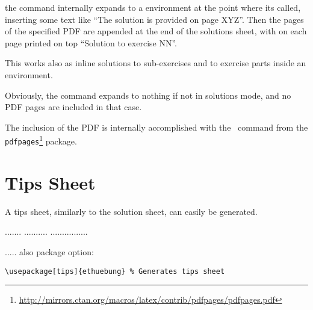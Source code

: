 \documentclass[11pt,a4paper]{article}
\begin{document}
the  command internally expands to a  environment
at the point where its called, inserting some text like ``The solution is provided on page
XYZ''. Then the pages of the specified PDF are appended at the end of the solutions sheet,
with on each page printed on top ``Solution to exercise NN''.

This works also as inline solutions to sub-exercises and to exercise parts inside an\\
 environment.

Obviously, the command expands to nothing if not in solutions mode, and no PDF pages are
included in that case.

The inclusion of the PDF is internally accomplished with the~ command
from the
\texttt{pdfpages}\footnote{\url{http://mirrors.ctan.org/macros/latex/contrib/pdfpages/pdfpages.pdf}}
package.





\section{Tips Sheet}
\label{sec:tips}

A tips sheet, similarly to the solution sheet, can easily be generated.

....... .......... ................



..... also package option:
\begin{pkgverbatim}
\begin{verbatim}
\usepackage[tips]{ethuebung} % Generates tips sheet
\end{verbatim}
\end{pkgverbatim}
\end{document}
